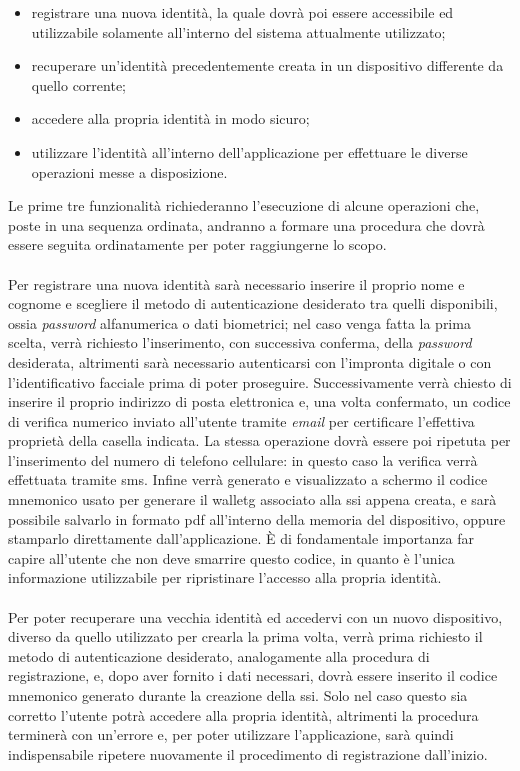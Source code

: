 \begin{itemize}
	\item registrare una nuova identità, la quale dovrà poi essere accessibile ed utilizzabile solamente all'interno del sistema attualmente utilizzato;
	\item recuperare un'identità precedentemente creata in un dispositivo differente da quello corrente;
	\item accedere alla propria identità in modo sicuro;
	\item utilizzare l'identità all'interno dell'applicazione per effettuare le diverse operazioni messe a disposizione.
\end{itemize}

Le prime tre funzionalità richiederanno l'esecuzione di alcune operazioni che, poste in una sequenza ordinata, andranno a formare una procedura che dovrà essere seguita ordinatamente per poter raggiungerne lo scopo.\\\\
Per registrare una nuova identità sarà necessario inserire il proprio nome e cognome e scegliere il metodo di autenticazione desiderato tra quelli disponibili, ossia \textit{password} alfanumerica o dati biometrici; nel caso venga fatta la prima scelta, verrà richiesto l'inserimento, con successiva conferma, della \textit{password} desiderata, altrimenti sarà necessario autenticarsi con l'impronta digitale o con l'identificativo facciale prima di poter proseguire. Successivamente verrà chiesto di inserire il proprio indirizzo di posta elettronica e, una volta confermato, un codice di verifica numerico inviato all'utente tramite \textit{email} per certificare l'effettiva proprietà della casella indicata. La stessa operazione dovrà essere poi ripetuta per l'inserimento del numero di telefono cellulare: in questo caso la verifica verrà effettuata tramite \gls{sms}\glsfirstoccur. Infine verrà generato e visualizzato a schermo il codice mnemonico usato per generare il \gls{walletg} associato alla \gls{ssi} appena creata, e sarà possibile salvarlo in formato \gls{pdf}\glsfirstoccur{} all'interno della memoria del dispositivo, oppure stamparlo direttamente dall'applicazione. È di fondamentale importanza far capire all'utente che non deve smarrire questo codice, in quanto è l'unica informazione utilizzabile per ripristinare l'accesso alla propria identità.\\\\
Per poter recuperare una vecchia identità ed accedervi con un nuovo dispositivo, diverso da quello utilizzato per crearla la prima volta, verrà prima richiesto il metodo di autenticazione desiderato, analogamente alla procedura di registrazione, e, dopo aver fornito i dati necessari, dovrà essere inserito il codice mnemonico generato durante la creazione della \gls{ssi}. Solo nel caso questo sia corretto l'utente potrà accedere alla propria identità, altrimenti la procedura terminerà con un'errore e, per poter utilizzare l'applicazione, sarà quindi indispensabile ripetere nuovamente il procedimento di registrazione dall'inizio.\\\\
